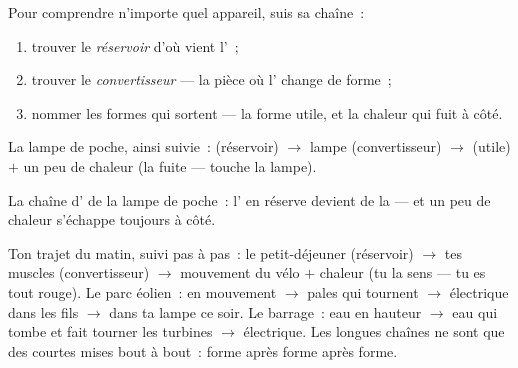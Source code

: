 \begin{method}\label{met:g5:everyday-energy:read}
Pour comprendre n'importe quel appareil, suis sa chaîne~:
\begin{enumerate}
  \item trouver le \emph{réservoir} d'où vient l'~;
  \item trouver le \emph{convertisseur} --- la pièce où l'
        change de forme~;
  \item nommer les formes qui sortent --- la forme utile, et la
        chaleur qui fuit à côté.
\end{enumerate}
La lampe de poche, ainsi suivie~:  (réservoir) $\to$ lampe
(convertisseur) $\to$  (utile) $+$ un peu de chaleur (la
fuite --- touche la lampe).
\end{method}

\begin{omfigure}

{\small La chaîne d' de la lampe de poche~: l' en
réserve devient de la  --- et un peu de chaleur s'échappe
toujours à côté.}
\end{omfigure}

\begin{example}\label{ex:g5:everyday-energy:chains}
Ton trajet du matin, suivi pas à pas~: le petit-déjeuner (réservoir)
$\to$ tes muscles (convertisseur) $\to$ mouvement du vélo $+$ chaleur
(tu la sens --- tu es tout rouge). Le parc éolien~:  en mouvement
$\to$ pales qui tournent $\to$  électrique dans les fils $\to$
 dans ta lampe ce soir. Le barrage~: eau en hauteur $\to$ eau
qui tombe et fait tourner les turbines $\to$  électrique. Les
longues chaînes ne sont que des courtes mises bout à bout~: forme
après forme après forme.
\end{example}

